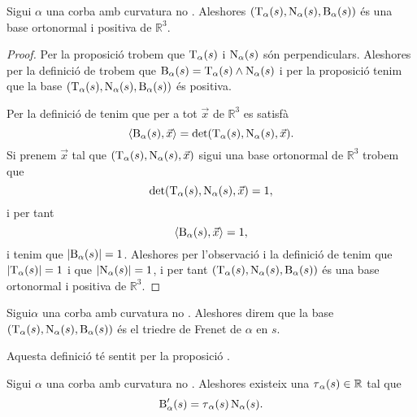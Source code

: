 \documentclass[../Apunts.tex]{subfiles}
\begin{document}
	\begin{proposition}
		\label{prop:triedre de Frenet}
		Sigui \(\alpha\) una corba amb curvatura no \nulla{}. Aleshores \((\operatorname{T}_{\alpha}(s),\operatorname{N}_{\alpha}(s),\operatorname{B}_{\alpha}(s))\) és una base ortonormal i positiva de \(\mathbb{R}^{3}\).
	\end{proposition}
	\begin{proof}
		Per la proposició  trobem que \(\operatorname{T}_{\alpha}(s)\) i \(\operatorname{N}_{\alpha}(s)\) són perpendiculars. Aleshores per la definició de  trobem que \(\operatorname{B}_{\alpha}(s)=\operatorname{T}_{\alpha}(s)\mathbin{\wedge}\operatorname{N}_{\alpha}(s)\) i per la proposició  tenim que la base \((\operatorname{T}_{\alpha}(s),\operatorname{N}_{\alpha}(s),\operatorname{B}_{\alpha}(s))\) és positiva.
		
		Per la definició de  tenim que per a tot \(\vec{x}\) de \(\mathbb{R}^{3}\) es satisfà
		\[\prodesc{\binormal_{\alpha}(s)}{\vec{x}}=\det(\tangent_{\alpha}(s),\normal_{\alpha}(s),\vec{x}).\]
		Si prenem \(\vec{x}\) tal que \((\operatorname{T}_{\alpha}(s),\operatorname{N}_{\alpha}(s),\vec{x})\) sigui una base ortonormal de \(\mathbb{R}^{3}\) trobem que
		\[\det(\operatorname{T}_{\alpha}(s),\operatorname{N}_{\alpha}(s),\vec{x})=1,\]
		i per tant
		\[\prodesc{\binormal_{\alpha}(s)}{\vec{x}}=1,\]
		i tenim que \(\norm{\binormal_{\alpha}(s)}=1\). Aleshores per l'observació  i la definició de  tenim que \(\norm{\tangent_{\alpha}(s)}=1\) i que \(\norm{\normal_{\alpha}(s)}=1\), i per tant \((\operatorname{T}_{\alpha}(s),\operatorname{N}_{\alpha}(s),\operatorname{B}_{\alpha}(s))\) és una base ortonormal i positiva de \(\mathbb{R}^{3}\). %
	\end{proof}
	\begin{definition}
		\label{def:triedre de Frenet}
		Sigui\(\alpha\) una corba amb curvatura no \nulla{}. Aleshores direm que la base \((\operatorname{T}_{\alpha}(s),\operatorname{N}_{\alpha}(s),\operatorname{B}_{\alpha}(s))\) és el triedre de Frenet de \(\alpha\) en \(s\).
		
		Aquesta definició té sentit per la proposició \myref{prop:triedre de Frenet}.
	\end{definition}
	\begin{proposition}
		\label{prop:torsió}
		Sigui \(\alpha\) una corba amb curvatura no \nulla{}. Aleshores existeix una \(\operatorname{\tau}_{\alpha}(s)\in\mathbb{R}\) tal que
		\[\operatorname{B}'_{\alpha}(s)=\operatorname{\tau}_{\alpha}(s)\operatorname{N}_{\alpha}(s).\]
	\end{proposition}
\end{document}
